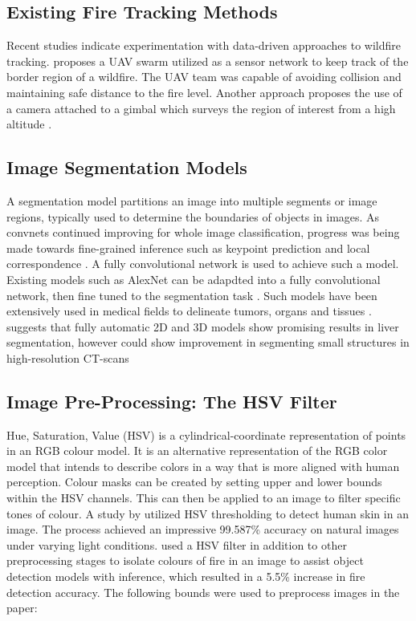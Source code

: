 \documentclass[lettersize,journal]{IEEEtran}
\begin{document}
\subsection{Existing Fire Tracking Methods}
Recent studies indicate experimentation with data-driven approaches to wildfire tracking. \cite{wildfiretrackuavswarm} proposes a UAV swarm utilized as a sensor network to keep track of the border region of a wildfire. The UAV team was capable of avoiding collision and maintaining safe distance to the fire level.
Another approach proposes the use of a camera attached to a gimbal which surveys the region of interest from a high altitude \cite{gimbal}. 

\subsection{Image Segmentation Models}
A segmentation model partitions an image into multiple segments or image regions, typically used to determine the boundaries of objects in images. As convnets continued improving for whole image classification, progress was being made towards fine-grained inference such as keypoint prediction and local correspondence \cite{segmentation}. A fully convolutional network is used to achieve such a model. Existing models such as AlexNet can be adapdted into a fully convolutional network, then fine tuned to the segmentation task \cite{segmentation}. Such models have been extensively used in medical fields to delineate tumors, organs and tissues \cite{tumorseg}. 
\cite{liverseg} suggests that fully automatic 2D and 3D models show promising results in liver segmentation, however could show improvement in segmenting small structures in high-resolution CT-scans

\subsection{Image Pre-Processing: The HSV Filter}

Hue, Saturation, Value (HSV) is a cylindrical-coordinate representation
of points in an RGB colour model. It is an alternative representation of
the RGB color model that intends to describe colors in a way that is
more aligned with human perception. Colour masks can be created by
setting upper and lower bounds within the HSV channels. This can then be
applied to an image to filter specific tones of colour. A study by
\cite{skinhsv} utilized HSV thresholding to detect human skin in an
image. The process achieved an impressive 99.587\% accuracy on natural
images under varying light conditions. \cite{prepfire} used a HSV filter
in addition to other preprocessing stages to isolate colours of fire in
an image to assist object detection models with inference, which
resulted in a 5.5\% increase in fire detection accuracy. The following
bounds were used to preprocess images in the paper:
\end{document}
